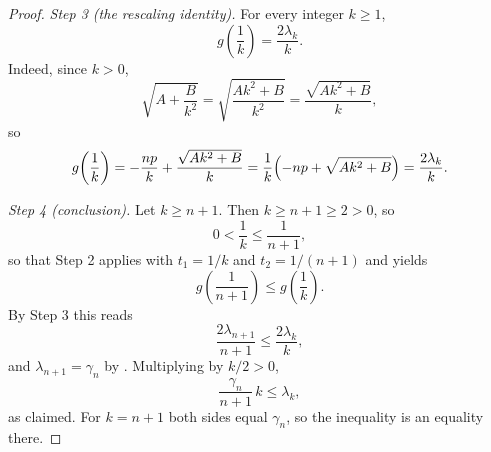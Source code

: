 \begin{proof}
\emph{Step 3 (the rescaling identity).}  For every integer $k\ge1$,
\[
  g\!\left(\frac1k\right)=\frac{2\lambda_k}{k}.
\]
Indeed, since $k>0$,
\[
  \sqrt{A+\frac{B}{k^2}}=\sqrt{\frac{Ak^2+B}{k^2}}
  =\frac{\sqrt{Ak^2+B}}{k},
\]
so
\[
  g\!\left(\frac1k\right)=-\frac{np}{k}+\frac{\sqrt{Ak^2+B}}{k}
  =\frac{1}{k}\Bigl(-np+\sqrt{Ak^2+B}\Bigr)=\frac{2\lambda_k}{k}.
\]

\emph{Step 4 (conclusion).}  Let $k\ge n+1$.  Then $k\ge n+1\ge2>0$, so
\[
  0<\frac1k\le\frac1{n+1},
\]
so that Step 2 applies with $t_1=1/k$ and $t_2=1/(n+1)$ and yields
\[
  g\!\left(\frac1{n+1}\right)\le g\!\left(\frac1k\right).
\]
By Step 3 this reads
\[
  \frac{2\lambda_{n+1}}{n+1}\le\frac{2\lambda_k}{k},
\]
and $\lambda_{n+1}=\gamma_n$ by .  Multiplying by
$k/2>0$,
\[
  \frac{\gamma_n}{n+1}\,k\le\lambda_k ,
\]
as claimed.  For $k=n+1$ both sides equal $\gamma_n$, so the inequality is an
equality there.
\end{proof}
